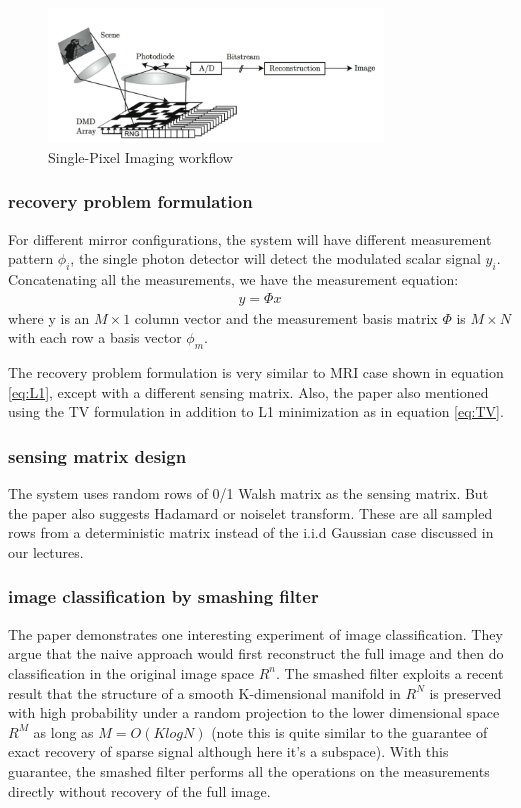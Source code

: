 \documentclass{article} %
\begin{document}
\begin{figure}[!h]
\centering
\includegraphics[width=3.5in]{singlePixFlow.png}
\caption{Single-Pixel Imaging workflow }
\label{fig:singlePixFlow}
\end{figure}

\subsubsection{recovery problem formulation}
For different mirror configurations, the system will have different measurement pattern $\phi_i$, the single photon detector will detect the modulated scalar signal $y_i$.  Concatenating all the measurements, we have the measurement equation:
\begin{align*}
y = \Phi x 
\end{align*}
where y is an $M \times 1$ column vector and the measurement basis matrix $\Phi$ is $M \times N$ with each row a basis vector $\phi_m$.

The recovery problem formulation is very similar to MRI case shown in equation \ref{eq:L1}, except with a different sensing matrix. Also, the paper also mentioned using the TV formulation in addition to L1 minimization as in equation \ref{eq:TV}.
\subsubsection{sensing matrix design}
The system uses random rows of 0/1 Walsh matrix as the sensing matrix. But the paper also suggests Hadamard or noiselet transform\cite{coifman2001noiselets}. These are all sampled rows from a deterministic matrix instead of the i.i.d Gaussian case discussed in our lectures.
\subsubsection{image classification by smashing filter}
The paper demonstrates one interesting experiment of image classification. They argue that the naive approach would first reconstruct the full image and then do classification in the original image space $R^n$. The smashed filter exploits a recent result that the structure of a smooth K-dimensional manifold in $R^N$ is preserved with high probability under a random projection to the lower dimensional space $R^M$ as long as $M = O (K log N )$ (note this is quite similar to the guarantee of exact recovery of sparse signal although here it's a subspace). With this guarantee, the smashed filter performs all the operations on the measurements directly without recovery of the full image.
\end{document}
